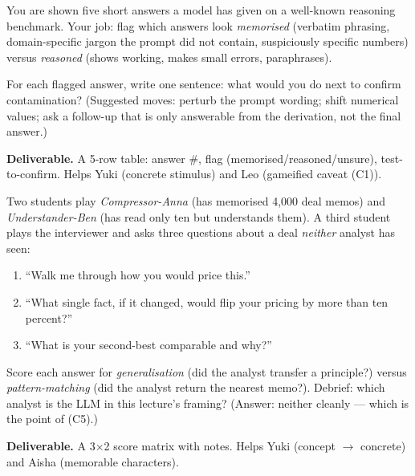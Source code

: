 \begin{activity}[title={Activity 8.2 --- Benchmark-contamination detective}]
You are shown five short answers a model has given on a well-known
reasoning benchmark. Your job: flag which answers look
\emph{memorised} (verbatim phrasing, domain-specific jargon the
prompt did not contain, suspiciously specific numbers) versus
\emph{reasoned} (shows working, makes small errors, paraphrases).

For each flagged answer, write one sentence: what would you do next
to confirm contamination? (Suggested moves: perturb the prompt
wording; shift numerical values; ask a follow-up that is only
answerable from the derivation, not the final answer.)

\textbf{Deliverable.} A 5-row table: answer \#, flag
(memorised/reasoned/unsure), test-to-confirm. Helps Yuki (concrete
stimulus) and Leo (gameified caveat (C1)).
\end{activity}

\begin{activity}[title={Activity 8.3 --- Two-analyst roleplay}]
Two students play \emph{Compressor-Anna} (has memorised 4{,}000 deal
memos) and \emph{Understander-Ben} (has read only ten but understands
them). A third student plays the interviewer and asks three
questions about a deal \emph{neither} analyst has seen:

\begin{enumerate}[leftmargin=1.4em,itemsep=2pt]
  \item ``Walk me through how you would price this.''
  \item ``What single fact, if it changed, would flip your pricing
        by more than ten percent?''
  \item ``What is your second-best comparable and why?''
\end{enumerate}

Score each answer for \emph{generalisation} (did the analyst
transfer a principle?) versus \emph{pattern-matching} (did the
analyst return the nearest memo?). Debrief: which analyst is the
LLM in this lecture's framing? (Answer: neither cleanly --- which
is the point of (C5).)

\textbf{Deliverable.} A 3$\times$2 score matrix with notes. Helps
Yuki (concept $\to$ concrete) and Aisha (memorable characters).
\end{activity}


